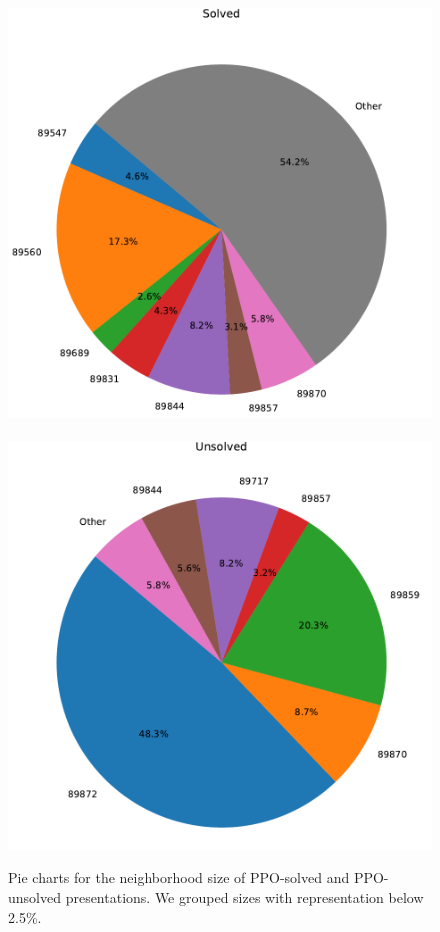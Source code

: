 \begin{figure}
	\centering
	\includegraphics[scale=.35]{fig/prime_solved_pie_rl_cropped.pdf}
	\ 
	\includegraphics[scale=.35]{fig/prime_unsolved_pie_rl_cropped.pdf}
	\caption{Pie charts for the neighborhood size of PPO-solved and PPO-unsolved presentations. We grouped sizes with representation below 2.5\%.}
	\label{fig:prime_pies}
\end{figure}

